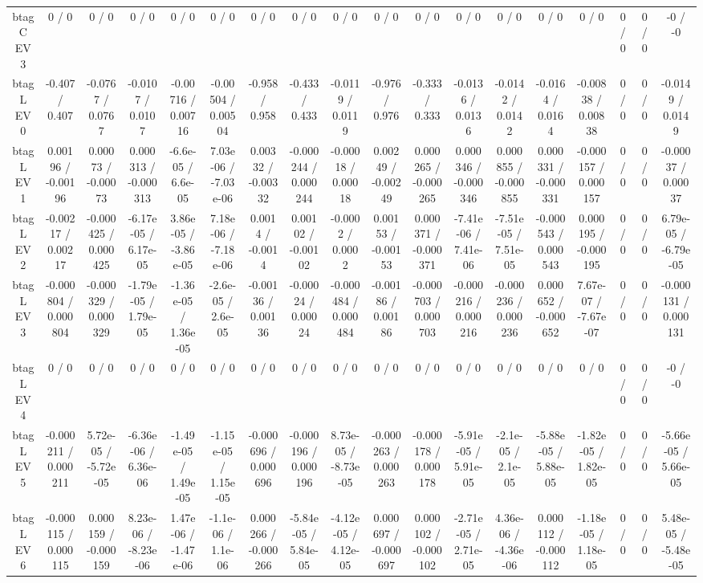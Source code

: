 \documentclass[10pt]{article}
\begin{document}
\begin{table}[htbp]
\begin{center}
\begin{tabular}{|c|c|c|c|c|c|c|c|c|c|c|c|c|c|c|c|c|c|}
  btag C EV 3 & 0 / 0 & 0 / 0 & 0 / 0 & 0 / 0 & 0 / 0 & 0 / 0 & 0 / 0 & 0 / 0 & 0 / 0 & 0 / 0 & 0 / 0 & 0 / 0 & 0 / 0 & 0 / 0 & 0 / 0 & 0 / 0 & -0 / -0 \\ 
  btag L EV 0 & -0.407 / 0.407 & -0.0767 / 0.0767 & -0.0107 / 0.0107 & -0.00716 / 0.00716 & -0.00504 / 0.00504 & -0.958 / 0.958 & -0.433 / 0.433 & -0.0119 / 0.0119 & -0.976 / 0.976 & -0.333 / 0.333 & -0.0136 / 0.0136 & -0.0142 / 0.0142 & -0.0164 / 0.0164 & -0.00838 / 0.00838 & 0 / 0 & 0 / 0 & -0.0149 / 0.0149 \\ 
  btag L EV 1 & 0.00196 / -0.00196 & 0.00073 / -0.00073 & 0.000313 / -0.000313 & -6.6e-05 / 6.6e-05 & 7.03e-06 / -7.03e-06 & 0.00332 / -0.00332 & -0.000244 / 0.000244 & -0.00018 / 0.00018 & 0.00249 / -0.00249 & 0.000265 / -0.000265 & 0.000346 / -0.000346 & 0.000855 / -0.000855 & 0.000331 / -0.000331 & -0.000157 / 0.000157 & 0 / 0 & 0 / 0 & -0.00037 / 0.00037 \\ 
  btag L EV 2 & -0.00217 / 0.00217 & -0.000425 / 0.000425 & -6.17e-05 / 6.17e-05 & 3.86e-05 / -3.86e-05 & 7.18e-06 / -7.18e-06 & 0.0014 / -0.0014 & 0.00102 / -0.00102 & -0.0002 / 0.0002 & 0.00153 / -0.00153 & 0.000371 / -0.000371 & -7.41e-06 / 7.41e-06 & -7.51e-05 / 7.51e-05 & -0.000543 / 0.000543 & 0.000195 / -0.000195 & 0 / 0 & 0 / 0 & 6.79e-05 / -6.79e-05 \\ 
  btag L EV 3 & -0.000804 / 0.000804 & -0.000329 / 0.000329 & -1.79e-05 / 1.79e-05 & -1.36e-05 / 1.36e-05 & -2.6e-05 / 2.6e-05 & -0.00136 / 0.00136 & -0.00024 / 0.00024 & -0.000484 / 0.000484 & -0.00186 / 0.00186 & -0.000703 / 0.000703 & -0.000216 / 0.000216 & -0.000236 / 0.000236 & 0.000652 / -0.000652 & 7.67e-07 / -7.67e-07 & 0 / 0 & 0 / 0 & -0.000131 / 0.000131 \\ 
  btag L EV 4 & 0 / 0 & 0 / 0 & 0 / 0 & 0 / 0 & 0 / 0 & 0 / 0 & 0 / 0 & 0 / 0 & 0 / 0 & 0 / 0 & 0 / 0 & 0 / 0 & 0 / 0 & 0 / 0 & 0 / 0 & 0 / 0 & -0 / -0 \\ 
  btag L EV 5 & -0.000211 / 0.000211 & 5.72e-05 / -5.72e-05 & -6.36e-06 / 6.36e-06 & -1.49e-05 / 1.49e-05 & -1.15e-05 / 1.15e-05 & -0.000696 / 0.000696 & -0.000196 / 0.000196 & 8.73e-05 / -8.73e-05 & -0.000263 / 0.000263 & -0.000178 / 0.000178 & -5.91e-05 / 5.91e-05 & -2.1e-05 / 2.1e-05 & -5.88e-05 / 5.88e-05 & -1.82e-05 / 1.82e-05 & 0 / 0 & 0 / 0 & -5.66e-05 / 5.66e-05 \\ 
  btag L EV 6 & -0.000115 / 0.000115 & 0.000159 / -0.000159 & 8.23e-06 / -8.23e-06 & 1.47e-06 / -1.47e-06 & -1.1e-06 / 1.1e-06 & 0.000266 / -0.000266 & -5.84e-05 / 5.84e-05 & -4.12e-05 / 4.12e-05 & 0.000697 / -0.000697 & 0.000102 / -0.000102 & -2.71e-05 / 2.71e-05 & 4.36e-06 / -4.36e-06 & 0.000112 / -0.000112 & -1.18e-05 / 1.18e-05 & 0 / 0 & 0 / 0 & 5.48e-05 / -5.48e-05 \\ 

\end{tabular}
\end{center}
\end{table}
\end{document}
